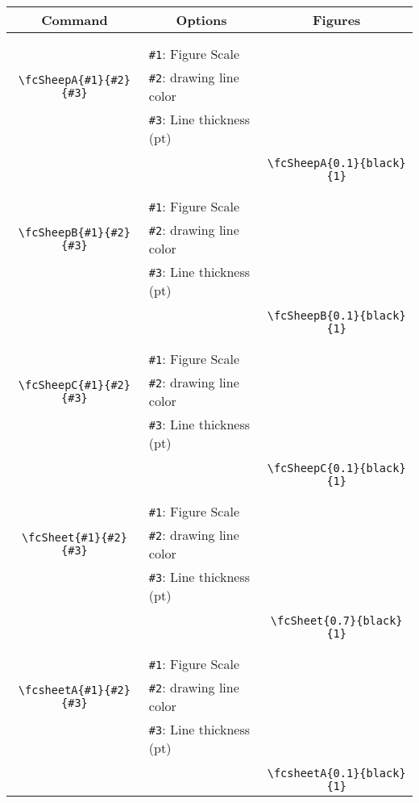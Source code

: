 \documentclass[x11names]{article}
\begin{document}
\begin{table}[H]\centering\begin{tabular}{|c|l|c|}\hline {\bf Command}& \multicolumn{1}{c|}{{\bf Options}} & {\bf Figures}\\  \hline	&&\multirow{5}{*}{\fcSheepA{0.1}{black}{1}}\\	&&\\	&\verb|#1|: Figure Scale &\\	\verb|\fcSheepA{#1}{#2}{#3}|&	\verb|#2|: drawing line color &\\	&\verb|#3|: Line thickness (pt) &\\ &&\\&&	\verb|\fcSheepA{0.1}{black}{1}|\\\hline 	
	&&\multirow{5}{*}{\fcSheepB{0.1}{black}{1}}\\	&&\\	&\verb|#1|: Figure Scale &\\	\verb|\fcSheepB{#1}{#2}{#3}|&	\verb|#2|: drawing line color &\\	&\verb|#3|: Line thickness (pt) &\\ &&\\&&	\verb|\fcSheepB{0.1}{black}{1}|\\\hline 	
	&&\multirow{5}{*}{\fcSheepC{0.1}{black}{1}}\\	&&\\	&\verb|#1|: Figure Scale &\\	\verb|\fcSheepC{#1}{#2}{#3}|&	\verb|#2|: drawing line color &\\	&\verb|#3|: Line thickness (pt) &\\ &&\\&&	\verb|\fcSheepC{0.1}{black}{1}|\\\hline 	
	&&\multirow{5}{*}{\fcSheet{0.7}{black}{1}}\\	&&\\	&\verb|#1|: Figure Scale &\\	\verb|\fcSheet{#1}{#2}{#3}|&	\verb|#2|: drawing line color &\\	&\verb|#3|: Line thickness (pt) &\\ &&\\&&	\verb|\fcSheet{0.7}{black}{1}|\\\hline 	
	&&\multirow{5}{*}{\fcsheetA{0.1}{black}{1}}\\	&&\\	&\verb|#1|: Figure Scale &\\	\verb|\fcsheetA{#1}{#2}{#3}|&	\verb|#2|: drawing line color &\\	&\verb|#3|: Line thickness (pt) &\\ &&\\&&	\verb|\fcsheetA{0.1}{black}{1}|\\\hline 	

\end{tabular}
\end{table}
\end{document}
